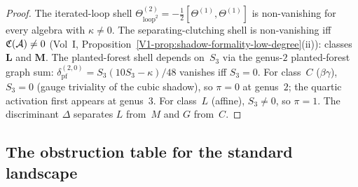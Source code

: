 \begin{proof}
The iterated-loop shell
$\Theta^{(2)}_{\mathrm{loop}^2} =
-\frac{1}{2}[\Theta^{(1)}, \Theta^{(1)}]$
is non-vanishing for every algebra with $\kappa \neq 0$.
The separating-clutching shell is non-vanishing iff
$\mathfrak{C}(\mathcal{A}) \neq 0$
\textup{(}Vol~I, Proposition~\textup{\ref*{V1-prop:shadow-formality-low-degree}(ii)}\textup{)}:
classes $\mathbf{L}$ and $\mathbf{M}$.
The planted-forest shell depends on~$S_3$ via the genus-$2$
planted-forest graph sum: $\delta_{\mathrm{pf}}^{(2,0)}
= S_3(10S_3 - \kappa)/48$ vanishes iff $S_3 = 0$.
For class~$C$ ($\beta\gamma$), $S_3 = 0$ (gauge triviality of
the cubic shadow), so $\pi = 0$ at genus~$2$; the quartic
activation first appears at genus~$3$. For class~$L$ (affine),
$S_3 \neq 0$, so $\pi = 1$. The discriminant $\Delta$
separates $L$ from~$M$ and $G$ from~$C$.
\end{proof}



\subsection{The obstruction table for the standard landscape}

